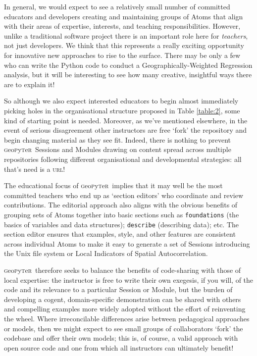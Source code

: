 \documentclass[letter, 11pt,titlepage]{article}
\newcommand{\gp}{\textsc{g}eo\textsc{p}y\textsc{t}e\textsc{r}~\/}
\begin{document}
In general, we would expect to see a relatively small number of committed educators and developers creating and maintaining groups of Atoms that align with their areas of expertise, interests, and teaching responsibilities. However, unlike a traditional software project there is an important role here for \emph{teachers}, not just developers. We think that this represents a really exciting opportunity for innovative new approaches to rise to the surface. There may be only a few who can write the Python code to conduct a Geographically-Weighted Regression analysis, but it will be interesting to see how many creative, insightful ways there are to explain it! 

So although we also expect interested educators to begin almost immediately picking holes in the organisational structure proposed in Table \ref{table:2}, some kind of starting point is needed. Moreover, as we've mentioned elsewhere, in the event of serious disagreement other instructors are free `fork' the repository and begin changing material as they see fit. Indeed, there is nothing to prevent \gp Sessions and Modules drawing on content spread across multiple repositories following different organisational and developmental strategies: all that's need is a \textsc{url}!

The educational focus of \gp implies that it may well be the most committed teachers who end up as `section editors' who coordinate and review contributions. The editorial approach also aligns with the obvious benefits of grouping sets of Atoms together into basic sections such as \texttt{foundations} (the basics of variables and data structures); \texttt{describe} (describing data); etc. The section editor ensures that examples, style, and other features are consistent across individual Atoms to make it easy to generate a set of Sessions introducing the Unix file system or Local Indicators of Spatial Autocorrelation.

\gp therefore seeks to balance the benefits of code-sharing with those of local expertise: the instructor is free to write their own exegesis, if you will, of the code and its relevance to a particular Session or Module, but the burden of developing a cogent, domain-specific demonstration can be shared with others and compelling examples more widely adopted without the effort of reinventing the wheel. Where irreconcilable differences arise between pedagogical approaches or models, then we might expect to see small groups of collaborators `fork' the codebase and offer their own models; this is, of course, a valid approach with open source code and one from which all instructors can ultimately benefit!
\end{document}
